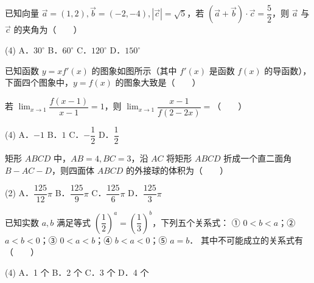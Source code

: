 \begin{question}
已知向量 $\vec{a} = (1, 2), \vec{b} = (-2, -4), |\vec{c}| = \sqrt{5}$，若 $(\vec{a} + \vec{b}) \cdot \vec{c} = \dfrac{5}{2}$，则 $\vec{a}$ 与 $\vec{c}$ 的夹角为\mbox{（　　）}

\begin{gkopts}(4)
\task A．$30^\circ$
\task B．$60^\circ$
\task C．$120^\circ$
\task D．$150^\circ$
\end{gkopts}

\Needspace{0.4\textheight}
\end{question}
\begin{question}
已知函数 $y = xf'(x)$ 的图象如图所示（其中 $f'(x)$ 是函数 $f(x)$ 的导函数），下面四个图象中，$y = f(x)$ 的图象大致是\mbox{（　　）}
\nopagebreak[4]
\begin{center}\end{center}
\nopagebreak[4]
\nopagebreak[4]
\begin{center}\end{center}
\nopagebreak[4]
\end{question}
\begin{question}
若 $\lim_{x \to 1} \dfrac{f(x-1)}{x-1} = 1$，则 $\lim_{x \to 1} \dfrac{x-1}{f(2-2x)} =$\mbox{（　　）}

\begin{gkopts}(4)
\task A．$-1$
\task B．$1$
\task C．$-\dfrac{1}{2}$
\task D．$\dfrac{1}{2}$
\end{gkopts}

\end{question}
\begin{question}
矩形 $ABCD$ 中，$AB = 4, BC = 3$，沿 $AC$ 将矩形 $ABCD$ 折成一个直二面角 $B - AC - D$，则四面体 $ABCD$ 的外接球的体积为\mbox{（　　）}

\begin{gkopts}(2)
\task A．$\dfrac{125}{12}\pi$
\task B．$\dfrac{125}{9}\pi$
\task C．$\dfrac{125}{6}\pi$
\task D．$\dfrac{125}{3}\pi$
\end{gkopts}

\end{question}
\begin{question}
已知实数 $a, b$ 满足等式 $\left(\dfrac{1}{2}\right)^a = \left(\dfrac{1}{3}\right)^b$，下列五个关系式：
① $0 < b < a$；② $a < b < 0$；③ $0 < a < b$；④ $b < a < 0$；⑤ $a = b$．
其中不可能成立的关系式有\mbox{（　　）}

\begin{gkopts}(4)
\task A．1 个
\task B．2 个
\task C．3 个
\task D．4 个
\end{gkopts}

\end{question}
